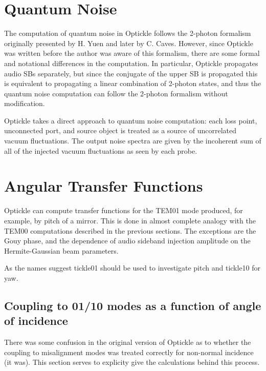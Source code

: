 \documentclass[12pt]{article}
\begin{document}
\section{Quantum Noise}

The computation of quantum noise in Optickle follows the 2-photon formalism
 originally presented by H. Yuen and later by C. Caves.
However, since Optickle was written before the author was aware of this formalism,
 there are some formal and notational differences in the computation.
In particular, Optickle propagates audio SBs separately, but since the conjugate of the upper SB
 is propagated this is equivalent to propagating a linear combination of 2-photon states,
 and thus the quantum noise computation can follow the 2-photon formalism without modification.

Optickle takes a direct approach to quantum noise computation:
 each loss point, unconnected port, and source object is treated as a source of
 uncorrelated vacuum fluctuations.
The output noise spectra are given by the incoherent sum of all of the injected vacuum
 fluctuations as seen by each probe.

\section{Angular Transfer Functions}

Optickle can compute transfer functions for the TEM01 mode produced,
for example, by pitch of a mirror.  This is done in almost complete
analogy with the TEM00 computations described in the previous
sections.  The exceptions are the Gouy phase, and the dependence of
audio sideband injection amplitude on the Hermite-Gaussian beam
parameters.

As the names suggest tickle01 should be used to investigate pitch and
tickle10 for yaw.

\subsection{Coupling to 01/10 modes as a function of angle of
  incidence}

There was some confusion in the original version of Optickle as to
whether the coupling to misalignment modes was treated correctly for
non-normal incidence (it was). This section serves to explicity give
the calculations behind this process.
\end{document}
